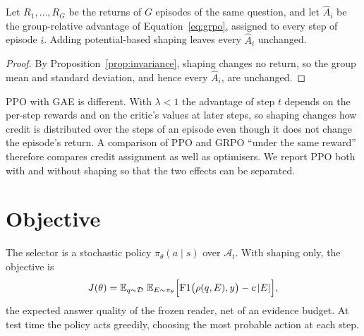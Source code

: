 \begin{proposition}
\label{prop:grpo-blind}
Let $R_1,\dots,R_G$ be the returns of $G$ episodes of the same question, and let $\hat A_i$ be the group-relative advantage of Equation~\eqref{eq:grpo}, assigned to every step of episode $i$. Adding potential-based shaping leaves every $\hat A_i$ unchanged.
\end{proposition}
\begin{proof}
By Proposition~\ref{prop:invariance}, shaping changes no return, so the group mean and standard deviation, and hence every $\hat A_i$, are unchanged.
\end{proof}

PPO with GAE is different. With $\lambda<1$ the advantage of step $t$ depends on the per-step rewards and on the critic's values at later steps, so shaping changes how credit is distributed over the steps of an episode even though it does not change the episode's return. A comparison of PPO and GRPO ``under the same reward'' therefore compares credit assignment as well as optimisers. We report PPO both with and without shaping so that the two effects can be separated.

\section{Objective}

The selector is a stochastic policy $\pi_\theta(a\mid s)$ over $\mathcal{A}_t$. With shaping only, the objective is
\begin{equation}
  J(\theta)=\E_{q\sim\mathcal{D}}\ \E_{\evid\sim\pi_\theta}\Big[\mathrm{F1}\big(\rho(q,\evid),y\big)-c\,|\evid|\Big],
\end{equation}
the expected answer quality of the frozen reader, net of an evidence budget. At test time the policy acts greedily, choosing the most probable action at each step.
